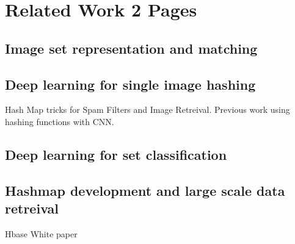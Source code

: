 \chapter{Related Work 2 Pages}

\section{Image set representation and matching}

\section{Deep learning for single image hashing}

Hash Map tricks for Spam Filters and Image Retreival. Previous work using hashing functions with CNN. 

\section{Deep learning for set classification}

\section{Hashmap development and large scale data retreival} 
Hbase White paper